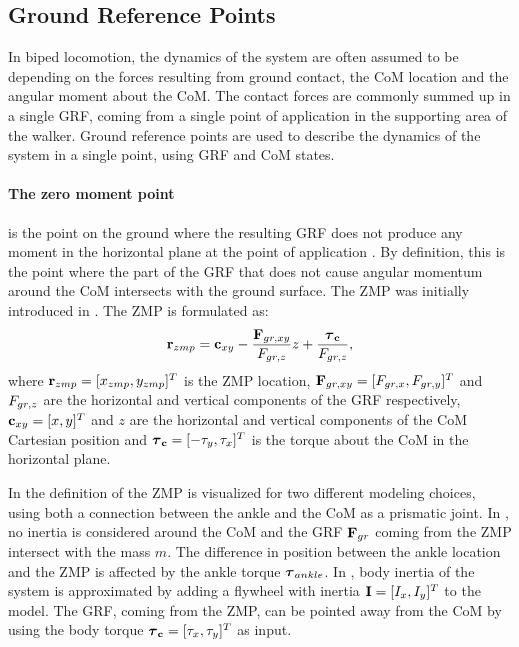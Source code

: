 \subsection{Ground Reference Points}\label{sec:grp}
In biped locomotion, the dynamics of the system are often assumed to be depending on the forces resulting from ground contact, the \ac{CoM} location and the angular moment about the \ac{CoM}. The contact forces are commonly summed up in a single \ac{GRF}, coming from a single point of application in the supporting area of the walker. Ground reference points are used to describe the dynamics of the system in a single point, using \ac{GRF} and \ac{CoM} states.

\paragraph{The zero moment point} is the point on the ground where the resulting \ac{GRF} does not produce any moment in the horizontal plane at the point of application \cite{sardain2004forces}. By definition, this is the point where the part of the \ac{GRF} that does not cause angular momentum around the \ac{CoM} intersects with the ground surface. The \ac{ZMP} was initially introduced in \cite{vukobratovic1969contribution}. The \ac{ZMP} is formulated as:
\begin{equation}
    \mathbf{r}_{zmp}=\mathbf{c}_{xy}-\frac{\mathbf{F}_{gr,xy}}{F_{gr,z}}z+\frac{\boldsymbol{\tau}_{\mathbf{c}}}{F_{gr,z}},
\end{equation}
where $\mathbf{r}_{zmp} = [x_{zmp}, y_{zmp}]^T$ is the \ac{ZMP} location, $\mathbf{F}_{gr,xy}=[F_{gr,x},F_{gr,y}]^T$ and $F_{gr,z}$ are the horizontal and vertical components of the \ac{GRF} respectively, $\mathbf{c}_{xy} = [x,y]^T$ and $z$ are the horizontal and vertical components of the \ac{CoM} Cartesian position and $\boldsymbol{\tau}_{\mathbf{c}} = [-\tau_y,\tau_x]^T$ is the torque about the \ac{CoM} in the horizontal plane. 

In  the definition of the \ac{ZMP} is visualized for two different modeling choices, using both a connection between the ankle and the \ac{CoM} as a prismatic joint. In , no inertia is considered around the \ac{CoM} and the \ac{GRF} $\mathbf{F}_{gr}$ coming from the \ac{ZMP} intersect with the mass $m$. The difference in position between the ankle location and the \ac{ZMP} is affected by the ankle torque $\boldsymbol{\tau}_{ankle}$. In , body inertia of the system is approximated by adding a flywheel with inertia $\mathbf{I} = [I_x, I_y]^T$ to the model. The \ac{GRF}, coming from the \ac{ZMP}, can be pointed away from the \ac{CoM} by using the body torque $\boldsymbol{\tau}_{\mathbf{c}} = [\tau_x, \tau_y]^T$ as input. 

